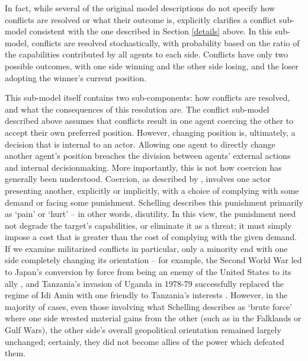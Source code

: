 In fact, while several of the original model descriptions \citep[in particular][]{bdm_1997,bdm_2002} do not specify how conflicts are resolved or what their outcome is, \citet{bdm_2011} explicitly clarifies a conflict sub-model consistent with the one described in Section \ref{details} above. In this sub-model, conflicts are resolved stochastically, with probability based on the ratio of the capabilities contributed by all agents to each side. Conflicts have only two possible outcomes, with one side winning and the other side losing, and the loser adopting the winner's current position.

This sub-model itself contains two sub-components: how conflicts are resolved, and what the consequences of this resolution are. The conflict sub-model described above assumes that conflicts result in one agent coercing the other to accept their own preferred position. However, changing position is, ultimately, a decision that is internal to an actor. Allowing one agent to directly change another agent's position breaches the division between agents' external actions and internal decisionmaking. More importantly, this is not how coercion has generally been understood. Coercion, as described by \citet{schelling_1966}, involves one actor presenting another, explicitly or implicitly, with a choice of complying with some demand or facing some punishment. Schelling describes this punishment primarily as  `pain' or `hurt' -- in other words, disutility. In this view, the punishment need not degrade the target's capabilities, or eliminate it as a threat; it must simply impose a cost that is greater than the cost of complying with the given demand. If we examine militarized conflicts in particular, only a minority end with one side completely changing its orientation -- for example, the Second World War led to Japan's conversion by force from being an enemy of the United States to its ally \citep{schaller_1997}, and Tanzania's invasion of Uganda in 1978-79 successfully replaced the regime of Idi Amin with one friendly to Tanzania's interests \citep{acheson_2001}. However, in the majority of cases, even those involving what Schelling describes as `brute force' where one side wrested material gains from the other (such as in the Falklands or Gulf Wars), the other side's overall geopolitical orientation remained largely unchanged; certainly, they did not become allies of the power which defeated them.

